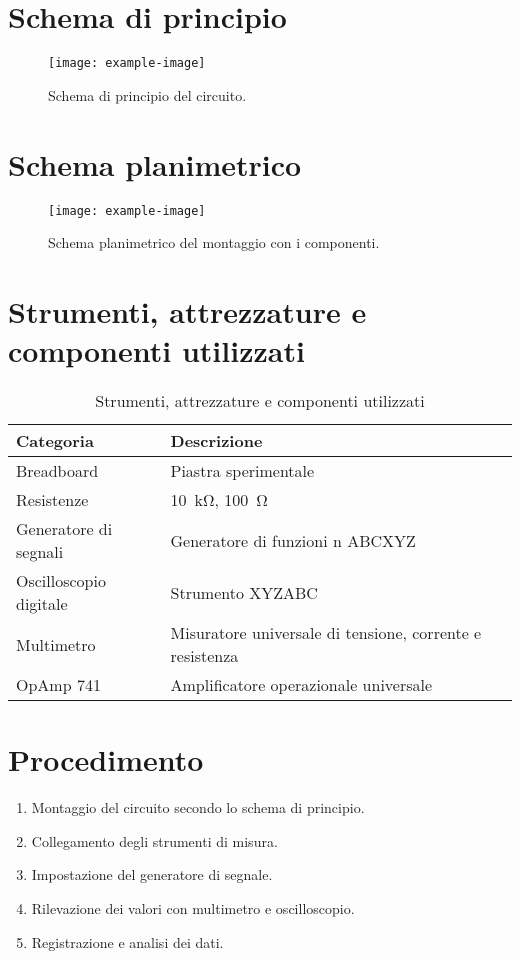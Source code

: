 \section*{Schema di principio}
\begin{figure}[H]
    \centering
    \texttt{[image: example-image]}
    \caption{Schema di principio del circuito.}
\end{figure}
\newpage

\section{Schema planimetrico}
\begin{figure}[H]
    \centering
    \texttt{[image: example-image]}
    \caption{Schema planimetrico del montaggio con i componenti.}
\end{figure}

\section{Strumenti, attrezzature e componenti utilizzati}
\begin{table}[H]
\centering
{}
\begin{tabular}{@{}|ll|@{}}
\toprule
\textbf{Categoria} & \textbf{Descrizione} \\ \midrule
Breadboard & Piastra sperimentale  \\
Resistenze & \SI{10}{\kilo\ohm}, \SI{100}{\ohm} \\
Generatore di segnali & Generatore di funzioni n ABCXYZ \\
Oscilloscopio digitale & Strumento XYZABC\\
Multimetro & Misuratore universale di tensione, corrente e resistenza \\
OpAmp 741 & Amplificatore operazionale universale \\ \bottomrule
\end{tabular}
\caption{Strumenti, attrezzature e componenti utilizzati}
\end{table}

\section{Procedimento}
\begin{enumerate}
    \item Montaggio del circuito secondo lo schema di principio.
    \item Collegamento degli strumenti di misura.
    \item Impostazione del generatore di segnale.
    \item Rilevazione dei valori con multimetro e oscilloscopio.
    \item Registrazione e analisi dei dati.
\end{enumerate}

